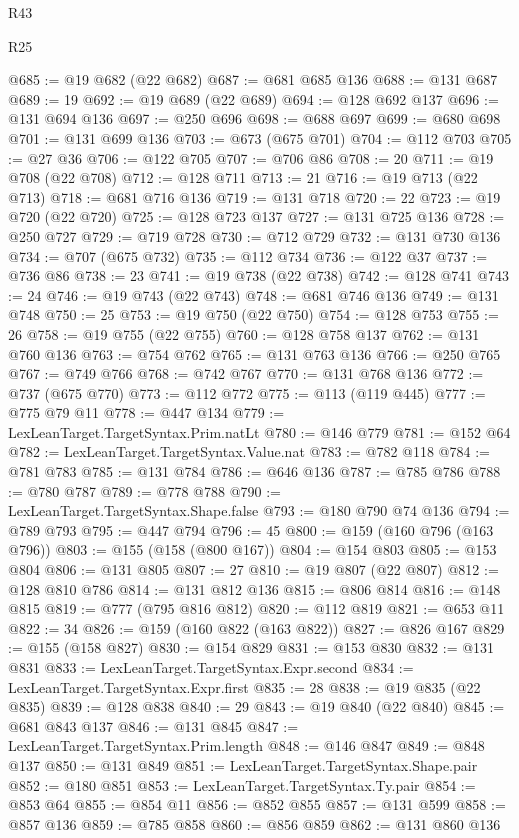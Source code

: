 \begin{lexlean}{R43}
\begin{lexlean}{R25}
\begin{coremodule}
{{{{{{{{{{{{{{{{{{{{{{{{{{{{{{{{{{{{{{{{{{{{{{{{{{{{{{{{{{{{{{{{{{{{{{{{{{{{{{{{{{{{{{{{{{{{{{{{{{{{{{{{{{{{{{{{{{{{{{{{{{{{{{{{{{{{{{{{{{{{{{{{{{{{{{{{{{{{{{{{{{{{{{{{{{{{{{{{{{{{{{{{{{{{{{{{{@685 := @19 @682 (@22 @682)
@687 := @681 @685 @136
@688 := @131 @687
@689 := 19
@692 := @19 @689 (@22 @689)
@694 := @128 @692 @137
@696 := @131 @694 @136
@697 := @250 @696
@698 := @688 @697
@699 := @680 @698
@701 := @131 @699 @136
@703 := @673 (@675 @701)
@704 := @112 @703
@705 := @27 @36
@706 := @122 @705
@707 := @706 @86
@708 := 20
@711 := @19 @708 (@22 @708)
@712 := @128 @711
@713 := 21
@716 := @19 @713 (@22 @713)
@718 := @681 @716 @136
@719 := @131 @718
@720 := 22
@723 := @19 @720 (@22 @720)
@725 := @128 @723 @137
@727 := @131 @725 @136
@728 := @250 @727
@729 := @719 @728
@730 := @712 @729
@732 := @131 @730 @136
@734 := @707 (@675 @732)
@735 := @112 @734
@736 := @122 @37
@737 := @736 @86
@738 := 23
@741 := @19 @738 (@22 @738)
@742 := @128 @741
@743 := 24
@746 := @19 @743 (@22 @743)
@748 := @681 @746 @136
@749 := @131 @748
@750 := 25
@753 := @19 @750 (@22 @750)
@754 := @128 @753
@755 := 26
@758 := @19 @755 (@22 @755)
@760 := @128 @758 @137
@762 := @131 @760 @136
@763 := @754 @762
@765 := @131 @763 @136
@766 := @250 @765
@767 := @749 @766
@768 := @742 @767
@770 := @131 @768 @136
@772 := @737 (@675 @770)
@773 := @112 @772
@775 := @113 (@119 @445)
@777 := @775 @79 @11
@778 := @447 @134
@779 := LexLeanTarget.TargetSyntax.Prim.natLt
@780 := @146 @779
@781 := @152 @64
@782 := LexLeanTarget.TargetSyntax.Value.nat
@783 := @782 @118
@784 := @781 @783
@785 := @131 @784
@786 := @646 @136
@787 := @785 @786
@788 := @780 @787
@789 := @778 @788
@790 := LexLeanTarget.TargetSyntax.Shape.false
@793 := @180 @790 @74 @136
@794 := @789 @793
@795 := @447 @794
@796 := 45
@800 := @159 (@160 @796 (@163 @796))
@803 := @155 (@158 (@800 @167))
@804 := @154 @803
@805 := @153 @804
@806 := @131 @805
@807 := 27
@810 := @19 @807 (@22 @807)
@812 := @128 @810 @786
@814 := @131 @812 @136
@815 := @806 @814
@816 := @148 @815
@819 := @777 (@795 @816 @812)
@820 := @112 @819
@821 := @653 @11
@822 := 34
@826 := @159 (@160 @822 (@163 @822))
@827 := @826 @167
@829 := @155 (@158 @827)
@830 := @154 @829
@831 := @153 @830
@832 := @131 @831
@833 := LexLeanTarget.TargetSyntax.Expr.second
@834 := LexLeanTarget.TargetSyntax.Expr.first
@835 := 28
@838 := @19 @835 (@22 @835)
@839 := @128 @838
@840 := 29
@843 := @19 @840 (@22 @840)
@845 := @681 @843 @137
@846 := @131 @845
@847 := LexLeanTarget.TargetSyntax.Prim.length
@848 := @146 @847
@849 := @848 @137
@850 := @131 @849
@851 := LexLeanTarget.TargetSyntax.Shape.pair
@852 := @180 @851
@853 := LexLeanTarget.TargetSyntax.Ty.pair
@854 := @853 @64
@855 := @854 @11
@856 := @852 @855
@857 := @131 @599
@858 := @857 @136
@859 := @785 @858
@860 := @856 @859
@862 := @131 @860 @136
}}}}}}}}}}}}}}}}}}}}}}}}}}}}}}}}}}}}}}}}}}}}}}}}}}}}}}}}}}}}}}}}}}}}}}}}}}}}}}}}}}}}}}}}}}}}}}}}}}}}}}}}}}}}}}}}}}}}}}}}}}}}}}}}}}}}}}}}}}}}}}}}}}}}}}}}}}}}}}}}}}}}}}}}}}}}}}}}}}}}}}}}}}}}}}}}}
\end{coremodule}
\end{lexlean}
\end{lexlean}
